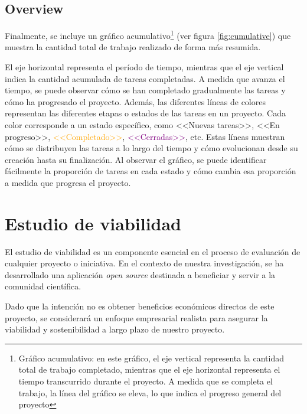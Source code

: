 
\subsection{Overview}
Finalmente, se incluye un gráfico acumulativo\footnote{Gráfico acumulativo: en este gráfico, el eje vertical representa la cantidad total de trabajo completado, mientras que el eje horizontal representa el tiempo transcurrido durante el proyecto. A medida que se completa el trabajo, la línea del gráfico se eleva, lo que indica el progreso general del proyecto} (ver figura \ref{fig:cumulative}) que muestra la cantidad total de trabajo realizado de forma más resumida.

El eje horizontal representa el período de tiempo, mientras que el eje vertical indica la cantidad acumulada de tareas completadas. A medida que avanza el tiempo, se puede observar cómo se han completado gradualmente las tareas y cómo ha progresado el proyecto. Además, las diferentes líneas de colores representan las diferentes etapas o estados de las tareas en un proyecto. Cada color corresponde a un estado específico, como \textcolor{mygreen}{<<Nuevas tareas>>}, \textcolor{mypurple}{<<En progreso>>}, \textcolor{orange}{<<Completado>>}, \textcolor{purple}{<<Cerradas>>}, etc. Estas líneas muestran cómo se distribuyen las tareas a lo largo del tiempo y cómo evolucionan desde su creación hasta su finalización. Al observar el gráfico, se puede identificar fácilmente la proporción de tareas en cada estado y cómo cambia esa proporción a medida que progresa el proyecto.




\section{Estudio de viabilidad}
El estudio de viabilidad es un componente esencial en el proceso de evaluación de cualquier proyecto o iniciativa. En el contexto de nuestra investigación, se ha desarrollado una aplicación \textit{open source} destinada a beneficiar y servir a la comunidad científica. 

Dado que la intención no es obtener beneficios económicos directos de este proyecto, se considerará un enfoque empresarial realista para asegurar la viabilidad y sostenibilidad a largo plazo de nuestro proyecto.

